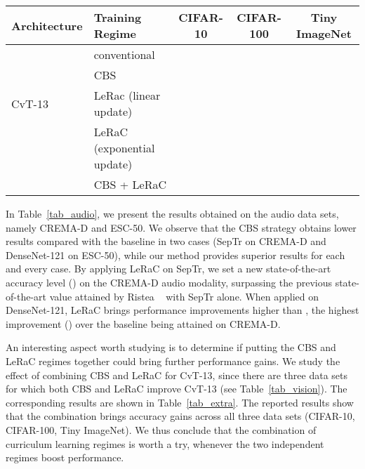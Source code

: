 \documentclass[10pt,twocolumn,letterpaper]{article}
\begin{document}
\begin{table*}
\small{
  \begin{center}
  \begin{tabular}{llccc}
    \toprule
    Architecture       & Training Regime     & CIFAR-10  & CIFAR-100 & Tiny ImageNet \\
    \midrule      
                 & conventional               &     &     &  \\
                 & CBS \cite{Sinha-NIPS-2020}            &     &     &  \\
    CvT-13             & LeRac (linear update) &  &  & \\
                 & LeRaC (exponential update)   &     &     &  \\
                 & CBS \cite{Sinha-NIPS-2020} + LeRaC    &     &     &  \\
    \bottomrule
  \end{tabular}
  \end{center}
  }
  \vspace{-0.6cm}
  \caption{Average accuracy rates (in \%) over 5 runs on CIFAR-10, CIFAR-100 and Tiny ImageNet for CvT-13 based on different training regimes: conventional, CBS \cite{Sinha-NIPS-2020}, LeRaC with linear update, LeRaC with exponential update (proposed), and a combination of CBS and LeRaC.\vspace{-0.45cm}}
  \label{tab_extra}
\end{table*}

In Table~\ref{tab_audio}, we present the results obtained on the audio data sets, namely CREMA-D and ESC-50. We observe that the CBS strategy obtains lower results compared with the baseline in two cases (SepTr on CREMA-D and DenseNet-121 on ESC-50), while our method provides superior results for each and every case. By applying LeRaC on SepTr, we set a new state-of-the-art accuracy level () on the CREMA-D audio modality, surpassing the previous state-of-the-art value attained by Ristea \etal~\cite{Ristea-ARXIV-2022} with SepTr alone. When applied on DenseNet-121, LeRaC brings performance improvements higher than , the highest improvement () over the baseline being attained on CREMA-D.

An interesting aspect worth studying is to determine if putting the CBS and LeRaC regimes together could bring further performance gains. We study the effect of combining CBS and LeRaC for CvT-13, since there are three data sets for which both CBS and LeRaC improve CvT-13 (see Table~\ref{tab_vision}). The corresponding results are shown in Table~\ref{tab_extra}. The reported results show that the combination brings accuracy gains across all three data sets (CIFAR-10, CIFAR-100, Tiny ImageNet). We thus conclude that the combination of curriculum learning regimes is worth a try, whenever the two independent regimes boost performance.
\end{document}
